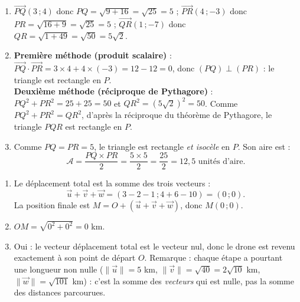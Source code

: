 \documentclass[11pt]{article}
\begin{document}
\begin{corrige}
\begin{enumerate}
\item $\overrightarrow{PQ}(3\,;4)$ donc $PQ = \sqrt{9+16} = \sqrt{25} = 5$ ; $\overrightarrow{PR}(4\,;-3)$ donc $PR = \sqrt{16+9} = \sqrt{25} = 5$ ; $\overrightarrow{QR}(1\,;-7)$ donc $QR = \sqrt{1+49} = \sqrt{50} = 5\sqrt{2}$.
\item \textbf{Première méthode (produit scalaire)} : $\overrightarrow{PQ}\cdot\overrightarrow{PR} = 3\times 4 + 4\times(-3) = 12-12 = 0$, donc $(PQ)\perp(PR)$ : le triangle est rectangle en $P$.\\
\textbf{Deuxième méthode (réciproque de Pythagore)} : $PQ^2+PR^2 = 25+25 = 50$ et $QR^2 = (5\sqrt{2})^2 = 50$. Comme $PQ^2+PR^2 = QR^2$, d'après la réciproque du théorème de Pythagore, le triangle $PQR$ est rectangle en $P$.
\item Comme $PQ = PR = 5$, le triangle est rectangle \emph{et isocèle} en $P$. Son aire est :
\[ \mathcal{A} = \frac{PQ\times PR}{2} = \frac{5\times 5}{2} = \frac{25}{2} = 12,5 \text{ unités d'aire.} \]
\end{enumerate}
\end{corrige}

\begin{corrige}
\begin{enumerate}
\item Le déplacement total est la somme des trois vecteurs :
\[ \vec{u}+\vec{v}+\vec{w} = (3-2-1\,;4+6-10) = (0\,;0). \]
La position finale est $M = O + (\vec{u}+\vec{v}+\vec{w})$, donc $M(0\,;0)$.
\item $OM = \sqrt{0^2+0^2} = 0$ km.
\item Oui : le vecteur déplacement total est le vecteur nul, donc le drone est revenu exactement à son point de départ $O$. Remarque : chaque étape a pourtant une longueur non nulle ($\|\vec{u}\| = 5$ km, $\|\vec{v}\| = \sqrt{40} = 2\sqrt{10}$ km, $\|\vec{w}\| = \sqrt{101}$ km) : c'est la somme des \emph{vecteurs} qui est nulle, pas la somme des distances parcourues.
\end{enumerate}
\end{corrige}
\end{document}
